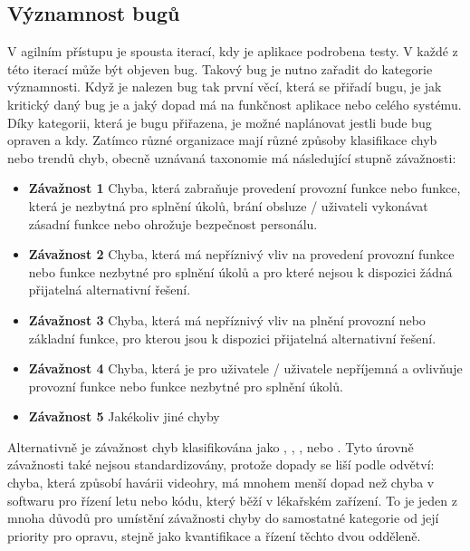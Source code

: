 \documentclass[czech,DP]{thesiskiv}
\begin{document}
\subsection{Významnost bugů}
V agilním přístupu je spousta iterací, kdy je aplikace podrobena testy. V každé z této iterací může být objeven bug. Takový bug je nutno zařadit do kategorie významnosti. Když je nalezen bug tak první věcí, která se přiřadí bugu, je jak kritický daný bug je a jaký dopad má na funkčnost aplikace nebo celého systému.  Díky kategorii, která je bugu přiřazena, je možné naplánovat jestli bude bug opraven a kdy. Zatímco různé organizace mají různé způsoby klasifikace chyb nebo trendů chyb, obecně uznávaná taxonomie má následující stupně závažnosti\citep{1989managing}:

\begin{itemize}
\item \textbf{Závažnost 1} Chyba, která zabraňuje provedení provozní funkce nebo funkce, která je nezbytná pro splnění úkolů, brání obsluze / uživateli vykonávat zásadní funkce nebo ohrožuje bezpečnost personálu.

\item \textbf{Závažnost 2} Chyba, která má nepříznivý vliv na provedení provozní funkce nebo funkce nezbytné pro splnění úkolů a pro které nejsou k dispozici žádná přijatelná alternativní řešení.

\item \textbf{Závažnost 3} Chyba, která má nepříznivý vliv na plnění provozní nebo základní funkce, pro kterou jsou k dispozici přijatelná alternativní řešení.

\item \textbf{Závažnost 4} Chyba, která je pro uživatele / uživatele nepříjemná a ovlivňuje provozní funkce nebo funkce nezbytné pro splnění úkolů.

\item \textbf{Závažnost 5} Jakékoliv jiné chyby
\end{itemize}

Alternativně je závažnost chyb klasifikována jako , , ,  nebo . Tyto úrovně závažnosti také nejsou standardizovány, protože dopady se liší podle odvětví: chyba, která způsobí havárii videohry, má mnohem menší dopad než chyba v softwaru pro řízení letu nebo kódu, který běží v lékařském zařízení. To je jeden z mnoha důvodů pro umístění závažnosti chyby do samostatné kategorie od její priority pro opravu, stejně jako kvantifikace a řízení těchto dvou odděleně.
\end{document}
